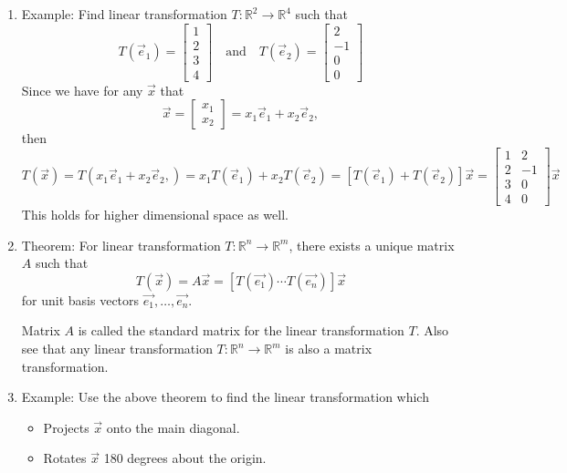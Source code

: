 \documentclass{article}
\begin{document}
\begin{enumerate}
\item Example: Find linear transformation $T: \mathbb{R}^2 \rightarrow \mathbb{R}^4$ such that
\[
T(\vec{e}_1) = \left[ \begin{array}{c}
1 \\ 2 \\ 3 \\ 4
\end{array} \right]
\quad \text{and} \quad
T(\vec{e}_2) = \left[ \begin{array}{c}
2 \\ -1 \\ 0 \\ 0
\end{array} \right]
\]
Since we have for any $\vec{x}$ that
\[
\vec{x} = \left[ \begin{array}{c}
x_1 \\ x_2
\end{array} \right]
= x_1 \vec{e}_1 + x_2 \vec{e}_2,
\]
then
\[
T(\vec{x}) = T(x_1 \vec{e}_1 + x_2 \vec{e}_2,)
= x_1 T(\vec{e}_1) + x_2 T(\vec{e}_2) 
= \left[ T(\vec{e}_1) + T(\vec{e}_2) \right] 
\vec{x}
=  \left[ \begin{array}{cc}
1 & 2 \\ 2 & -1 \\ 3 & 0 \\ 4 & 0
\end{array} \right] \vec{x}
\]
This holds for higher dimensional space as well.

\item Theorem: For linear transformation $T:\mathbb{R}^n \rightarrow \mathbb{R}^m$, there exists a unique matrix $A$ such that
\[
T(\vec{x}) = A\vec{x} = \left[ T(\vec{e_1}) \cdots T(\vec{e_n}) \right]\vec{x}
\]
for unit basis vectors $\vec{e_1}, \dots, \vec{e_n}$.

Matrix $A$ is called the standard matrix for the linear transformation $T$. Also see that any linear transformation $T:\mathbb{R}^n \rightarrow \mathbb{R}^m$ is also a matrix transformation.

\item Example: Use the above theorem to find the linear transformation which 
\begin{itemize}
\item Projects $\vec{x}$ onto the main diagonal.
\item Rotates $\vec{x}$ 180 degrees about the origin.
\end{itemize}


\end{enumerate}
\end{document}
